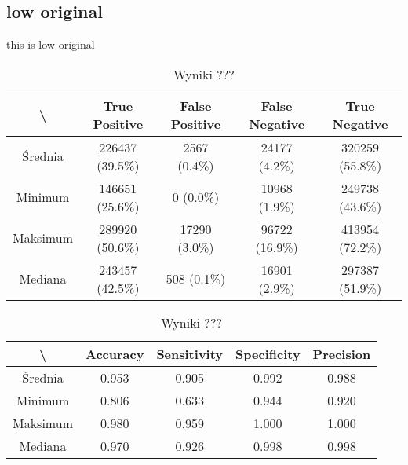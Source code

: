 \subsection{low original}
this is low original

\begin{table}[H]
	\centering
	\caption{Wyniki ???}
	\vspace{6pt}
	{\footnotesize
		\begin{tabular}{|c|c|c|c|c|}
      \hline \textbackslash & True Positive & False Positive & False Negative & True Negative \\
      \hline Średnia & 226437 (39.5\%) & 2567 (0.4\%) & 24177 (4.2\%) & 320259 (55.8\%) \\
      \hline Minimum & 146651 (25.6\%) & 0 (0.0\%) & 10968 (1.9\%) & 249738 (43.6\%) \\
      \hline Maksimum & 289920 (50.6\%) & 17290 (3.0\%) & 96722 (16.9\%) & 413954 (72.2\%) \\
      \hline Mediana & 243457 (42.5\%) & 508 (0.1\%) & 16901 (2.9\%) & 297387 (51.9\%) \\
      \hline
		\end{tabular}
	}
	\vspace{0pt}
\end{table}


\begin{table}[H]
	\centering
	\caption{Wyniki ???}
	\vspace{6pt}
	{\footnotesize
		\begin{tabular}{|c|c|c|c|c|}
      \hline \textbackslash & Accuracy & Sensitivity & Specificity & Precision \\
      \hline Średnia & 0.953 & 0.905 & 0.992 & 0.988 \\
      \hline Minimum & 0.806 & 0.633 & 0.944 & 0.920 \\
      \hline Maksimum & 0.980 & 0.959 & 1.000 & 1.000 \\
      \hline Mediana & 0.970 & 0.926 & 0.998 & 0.998 \\
      \hline
		\end{tabular}
	}
	\vspace{0pt}
\end{table}


